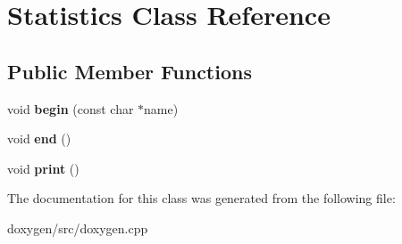 \hypertarget{class_statistics}{}\section{Statistics Class Reference}
\label{class_statistics}
\subsection*{Public Member Functions}
\begin{DoxyCompactItemize}
\item 
\mbox{\label{class_statistics_a98a419d6e4e62c2bccac88b27a9769ca}} 
void {\bfseries begin} (const char $\ast$name)
\item 
\mbox{\label{class_statistics_aa3c0ae123d9f74e170ba1bab16dd8575}} 
void {\bfseries end} ()
\item 
\mbox{\label{class_statistics_a681d86ad7e9121de36d517420e135415}} 
void {\bfseries print} ()
\end{DoxyCompactItemize}


The documentation for this class was generated from the following file\+:\begin{DoxyCompactItemize}
\item 
doxygen/src/doxygen.\+cpp\end{DoxyCompactItemize}
